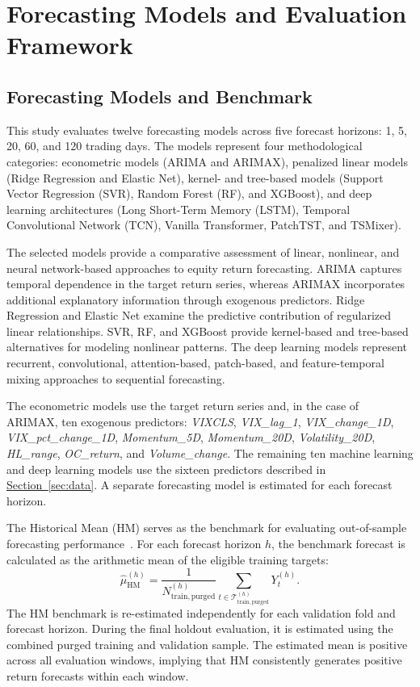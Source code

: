 \documentclass[12pt,twoside]{ord}
\begin{document}
\section{Forecasting Models and Evaluation Framework}\label{sec:methodology}

\subsection{Forecasting Models and Benchmark}\label{subsec:models_benchmark}

This study evaluates twelve forecasting models across five forecast horizons: 1, 5, 20, 60, and 120 trading days. The models represent four methodological categories: econometric models (ARIMA and ARIMAX), penalized linear models (Ridge Regression and Elastic Net), kernel- and tree-based models (Support Vector Regression (SVR), Random Forest (RF), and XGBoost), and deep learning architectures (Long Short-Term Memory (LSTM), Temporal Convolutional Network (TCN), Vanilla Transformer, PatchTST, and TSMixer).

The selected models provide a comparative assessment of linear, nonlinear, and neural network-based approaches to equity return forecasting. ARIMA captures temporal dependence in the target return series, whereas ARIMAX incorporates additional explanatory information through exogenous predictors. Ridge Regression and Elastic Net examine the predictive contribution of regularized linear relationships. SVR, RF, and XGBoost provide kernel-based and tree-based alternatives for modeling nonlinear patterns. The deep learning models represent recurrent, convolutional, attention-based, patch-based, and feature-temporal mixing approaches to sequential forecasting.

The econometric models use the target return series and, in the case of ARIMAX, ten exogenous predictors: \textit{VIXCLS}, \textit{VIX\_lag\_1}, \textit{VIX\_change\_1D}, \textit{VIX\_pct\_change\_1D}, \textit{Momentum\_5D}, \textit{Momentum\_20D}, \textit{Volatility\_20D}, \textit{HL\_range}, \textit{OC\_return}, and \textit{Volume\_change}. The remaining ten machine learning and deep learning models use the sixteen predictors described in \hyperref[sec:data]{Section~\ref*{sec:data}}. A separate forecasting model is estimated for each forecast horizon.

The Historical Mean (HM) serves as the benchmark for evaluating out-of-sample forecasting performance~\cite{welch2008}. For each forecast horizon $h$, the benchmark forecast is calculated as the arithmetic mean of the eligible training targets:
\begin{equation}\label{eq:historical_mean}
\widehat{\mu}_{\mathrm{HM}}^{(h)}
=
\frac{1}{N_{\mathrm{train,purged}}^{(h)}}
\sum_{t\in \mathcal{T}_{\mathrm{train,purged}}^{(h)}}
Y_t^{(h)}.
\end{equation}
The HM benchmark is re-estimated independently for each validation fold and forecast horizon. During the final holdout evaluation, it is estimated using the combined purged training and validation sample. The estimated mean is positive across all evaluation windows, implying that HM consistently generates positive return forecasts within each window.
\end{document}
